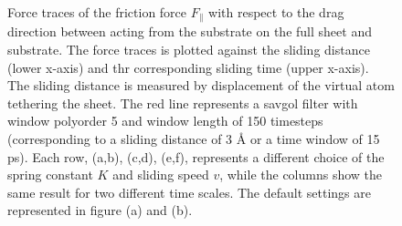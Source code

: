 \begin{figure}[H]
\begin{subfigure}[t]{0.49\textwidth}
      \label{fig:drag_Ff_100_K10_v1}
  \end{subfigure}
  \hfill
     \caption{Force traces of the friction force $F_\parallel$ with respect to the drag direction between acting from the substrate on the full sheet and substrate. The force traces is plotted against the sliding distance (lower x-axis) and thr corresponding sliding time (upper x-axis). The sliding distance is measured by displacement of the virtual atom tethering the sheet. The red line represents a savgol filter with window polyorder 5 and window length of 150 timesteps (corresponding to a sliding distance of 3 Å or a time window of 15 ps). Each row, (a,b), (c,d), (e,f), represents a different choice of the spring constant $K$ and sliding speed $v$, while the columns show the same result for two different time scales. The default settings are represented in figure (a) and (b).}
     \label{fig:drag_Ff}
\end{figure}

